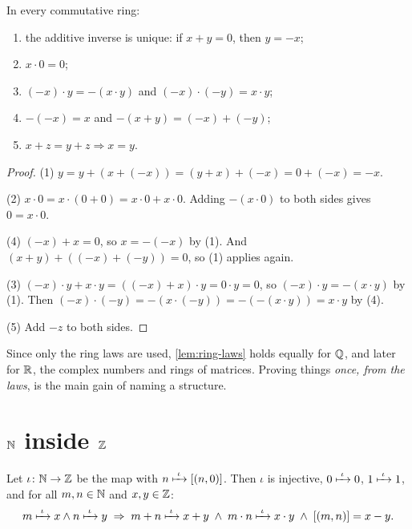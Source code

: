 \begin{lemma}
\label{lem:ring-laws}
In every commutative ring:
\begin{enumerate}
  \item the additive inverse is unique: if $x + y = 0$, then $y = -x$;
  \item $x \cdot 0 = 0$;
  \item $(-x) \cdot y = -(x \cdot y)$ and $(-x) \cdot (-y) = x \cdot y$;
  \item $-(-x) = x$ and $-(x + y) = (-x) + (-y)$;
  \item $x + z = y + z \Rightarrow x = y$.
\end{enumerate}
\end{lemma}

\begin{proof}
(1) $y = y + (x + (-x)) = (y + x) + (-x) = 0 + (-x) = -x$.

(2) $x \cdot 0 = x \cdot (0 + 0) = x \cdot 0 + x \cdot 0$. Adding $-(x \cdot 0)$
to both sides gives $0 = x \cdot 0$.

(4) $(-x) + x = 0$, so $x = -(-x)$ by (1). And $(x + y) + ((-x) + (-y)) = 0$, so
(1) applies again.

(3) $(-x) \cdot y + x \cdot y = ((-x) + x) \cdot y = 0 \cdot y = 0$, so $(-x) \cdot
y = -(x \cdot y)$ by (1). Then $(-x) \cdot (-y) = -(x \cdot (-y)) = -(-(x \cdot
y)) = x \cdot y$ by (4).

(5) Add $-z$ to both sides.
\end{proof}

Since only the ring laws are used, \cref{lem:ring-laws} holds equally for $\mathbb{Q}$, and
later for $\mathbb{R}$, the complex numbers and rings of matrices. Proving things
\emph{once, from the laws}, is the main gain of naming a structure.

\section{\texorpdfstring{$\mathbb{N}$}{N} inside \texorpdfstring{$\mathbb{Z}$}{Z}}

\begin{theorem}[Embedding]
\label{thm:integers-embedding}
Let $\iota \colon \mathbb{N} \to \mathbb{Z}$ be the map with $n \xmapsto{\;\iota\;} [(n, 0)]$. Then $\iota$
is injective, $0 \xmapsto{\;\iota\;} 0$, $1 \xmapsto{\;\iota\;} 1$, and for all $m, n \in \mathbb{N}$ and
$x, y \in \mathbb{Z}$:
\[
  m \xmapsto{\;\iota\;} x \land n \xmapsto{\;\iota\;} y \;\Rightarrow\; m + n \xmapsto{\;\iota\;} x + y
  \;\land\; m \cdot n \xmapsto{\;\iota\;} x \cdot y \;\land\; [(m, n)] = x - y.
\]
\end{theorem}


